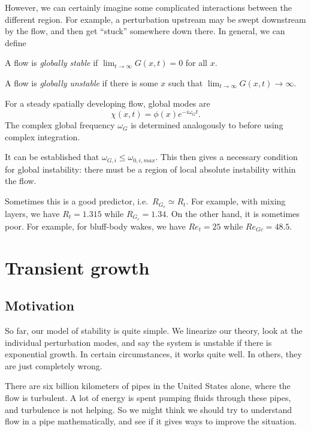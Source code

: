 \documentclass[a4paper]{article}
\begin{document}
However, we can certainly imagine some complicated interactions between the different region. For example, a perturbation upstream may be swept downstream by the flow, and then get ``stuck'' somewhere down there. In general, we can define

%
%
\begin{defi}
  A flow is \emph{globally stable} if $\lim_{t \to \infty} G(x, t) = 0$ for all $x$.

  A flow is \emph{globally unstable} if there is some $x$ such that $\lim_{t \to \infty} G(x, t) \to \infty$.
\end{defi}

For a steady spatially developing flow, global modes are
\[
  \chi(x, t) = \phi(x) e^{-i \omega_G t}.
\]
The complex global frequency $\omega_G$ is determined analogously to before using complex integration.

It can be established that $\omega_{G, i} \leq \omega_{0, i, max}$. This then gives a necessary condition for global instability: there must be a region of local absolute instability within the flow.

Sometimes this is a good predictor, i.e.\ $R_{G_c} \simeq R_t$. For example, with mixing layers, we have $R_t = 1.315$ while $R_{G_c} = 1.34$. On the other hand, it is sometimes poor. For example, for bluff-body wakes, we have $Re_t = 25$ while $Re_{Gc} = 48.5$.

\section{Transient growth}
\subsection{Motivation}
So far, our model of stability is quite simple. We linearize our theory, look at the individual perturbation modes, and say the system is unstable if there is exponential growth. In certain circumstances, it works quite well. In others, they are just completely wrong.

There are six billion kilometers of pipes in the United States alone, where the flow is turbulent. A lot of energy is spent pumping fluids through these pipes, and turbulence is not helping. So we might think we should try to understand flow in a pipe mathematically, and see if it gives ways to improve the situation.
\end{document}
